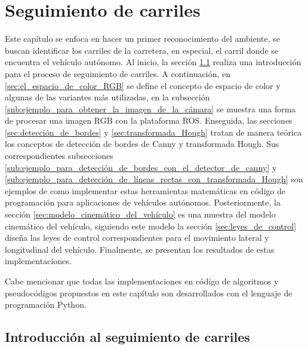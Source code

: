 \chapter{Seguimiento de carriles} \label{cap:seguimiento_de_carriles}
Este capítulo se enfoca en hacer un primer reconocimiento del ambiente, se buscan identificar los carriles de la carretera, en especial, el carril donde se encuentra el vehículo autónomo. Al inicio, la sección \ref{sec:introducción_al_seguimiento_de_carriles} realiza una introducción para el proceso de seguimiento de carriles. A continuación, en \ref{sec:el_espacio_de_color_RGB} se define el concepto de espacio de color y algunas de las variantes más utilizadas, en la subsección \ref{sub:ejemplo_para_obtener_la_imagen_de_la_cámara} se muestra una forma de procesar una imagen RGB con la plataforma ROS. Enseguida, las secciones \ref{sec:detección_de_bordes} y \ref{sec:transformada_Hough} tratan de manera teórica los conceptos de detección de bordes de Canny y transformada Hough. Sus correspondientes subsecciones \ref{sub:ejemplo_para_detección_de_bordes_con_el_detector_de_canny} y \ref{sub:ejemplo_para_detección_de_líneas_rectas_con_transformada_Hough} son ejemplos de como implementar estas herramientas matemáticas en código de programación para aplicaciones de vehículos autónomos. Posteriormente, la sección \ref{sec:modelo_cinemático_del_vehículo} es una muestra del modelo cinemático del vehículo, siguiendo este modelo la sección \ref{sec:leyes_de_control} diseña las leyes de control correspondientes para el movimiento lateral y longitudinal del vehículo. Finalmente, se presentan los resultados de estas implementaciones.

Cabe mencionar que todas las implementaciones en código de algoritmos y pseudocódigos propuestos en este capítulo son desarrollados con el lenguaje de programación Python.

\section{Introducción al seguimiento de carriles} \label{sec:introducción_al_seguimiento_de_carriles}

